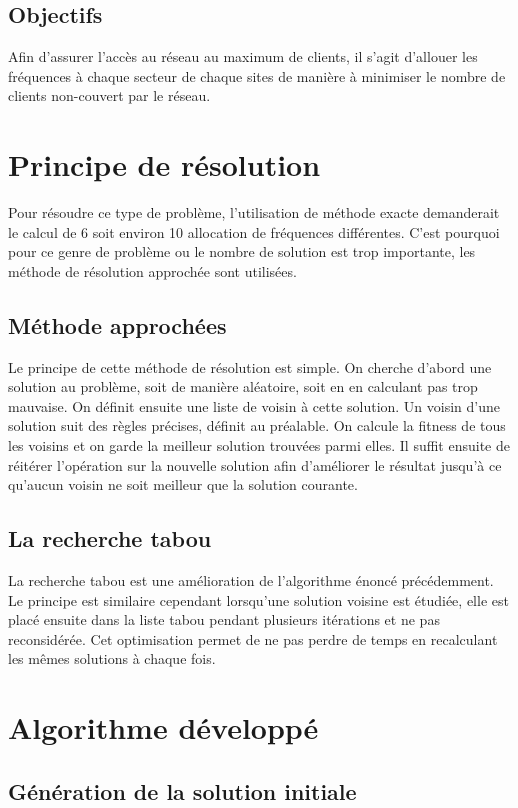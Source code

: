 \documentclass[a4paper, 12pt]{report}
\begin{document}
\section{Objectifs}
Afin d'assurer l'accès au réseau au maximum de clients, il s'agit d'allouer les fréquences à chaque secteur de chaque sites de manière à minimiser le nombre de clients non-couvert par le réseau.

\chapter{Principe de résolution}
Pour résoudre ce type de problème, l'utilisation de méthode exacte demanderait le calcul de 6 soit environ 10 allocation de fréquences différentes. C'est pourquoi pour ce genre de problème ou le nombre de solution est trop importante, les méthode de résolution approchée sont utilisées.

\section{Méthode approchées}
Le principe de cette méthode de résolution est simple. On cherche d'abord une solution au problème, soit de manière aléatoire, soit en en calculant pas trop mauvaise.
On définit ensuite une liste de voisin à cette solution. Un voisin d'une solution suit des règles précises, définit au préalable. On calcule la fitness de tous les voisins et on garde la meilleur solution trouvées parmi elles. Il suffit ensuite de réitérer l'opération sur la nouvelle solution afin d'améliorer le résultat jusqu'à ce qu'aucun voisin ne soit meilleur que la solution courante.

\section{La recherche tabou}
La recherche tabou est une amélioration de l'algorithme énoncé précédemment. Le principe est similaire cependant lorsqu'une solution voisine est étudiée, elle est placé ensuite dans la liste tabou pendant plusieurs itérations et ne pas reconsidérée. Cet optimisation permet de ne pas perdre de temps en recalculant les mêmes solutions à chaque fois.

\chapter{Algorithme développé}
\section{Génération de la solution initiale}
\end{document}
